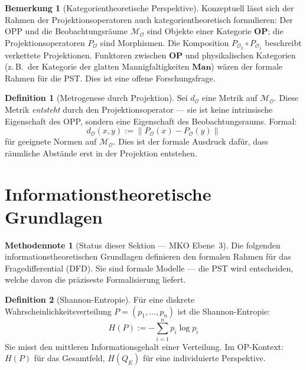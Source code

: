 \documentclass[11pt,a4paper]{article}
\theoremstyle{plain}
\theoremstyle{definition}
\newtheorem{definition}{Definition}[section]
\newtheorem{remark}{Bemerkung}[section]
\newtheorem{methodennote}{Methodennote}[section]
\begin{document}
\begin{remark}[Kategorientheoretische Perspektive]
Konzeptuell l\"{a}sst sich der Rahmen der Projektionsoperatoren auch
kategorientheoretisch formulieren: Der OPP und die Beobachtungsr\"{a}ume
$\mathcal{M}_{\mathcal{O}}$ sind Objekte einer Kategorie $\mathbf{OP}$; die
Projektionsoperatoren $P_{\mathcal{O}}$ sind Morphismen. Die Komposition
$P_{\mathcal{O}_2} \circ P_{\mathcal{O}_1}$ beschreibt verkettete Projektionen.
Funktoren zwischen $\mathbf{OP}$ und physikalischen Kategorien (z.\,B.\ der Kategorie
der glatten Mannigfaltigkeiten $\mathbf{Man}$) w\"{a}ren der formale Rahmen f\"{u}r die
PST. Dies ist eine offene Forschungsfrage.
\end{remark}

\begin{definition}[Metrogenese durch Projektion]
Sei $d_{\mathcal{O}}$ eine Metrik auf $\mathcal{M}_{\mathcal{O}}$. Diese Metrik
\emph{entsteht} durch den Projektionsoperator --- sie ist keine intrinsische
Eigenschaft des OPP, sondern eine Eigenschaft des Beobachtungsraums. Formal:
\[
  d_{\mathcal{O}}(x, y) := \| P_{\mathcal{O}}(x) - P_{\mathcal{O}}(y) \|
\]
f\"{u}r geeignete Normen auf $\mathcal{M}_{\mathcal{O}}$. Dies ist der formale
Ausdruck daf\"{u}r, dass r\"{a}umliche Abst\"{a}nde erst in der Projektion entstehen.
\end{definition}

\section{Informationstheoretische Grundlagen}

\begin{methodennote}[Status dieser Sektion --- MKO Ebene~3]
Die folgenden informationstheoretischen Grundlagen definieren den formalen Rahmen
f\"{u}r das Fragedifferential (DFD). Sie sind formale Modelle --- die PST wird
entscheiden, welche davon die pr\"{a}ziseste Formalisierung liefert.
\end{methodennote}

\begin{definition}[Shannon-Entropie]
F\"{u}r eine diskrete Wahrscheinlichkeitsverteilung $P = (p_1, \ldots, p_n)$ ist die
Shannon-Entropie:
\[
  H(P) := -\sum_{i=1}^{n} p_i \log p_i
\]
Sie misst den mittleren Informationsgehalt einer Verteilung. Im OP-Kontext:
$H(P)$ f\"{u}r das Gesamtfeld, $H(Q_E)$ f\"{u}r eine individuierte Perspektive.
\end{definition}
\end{document}

